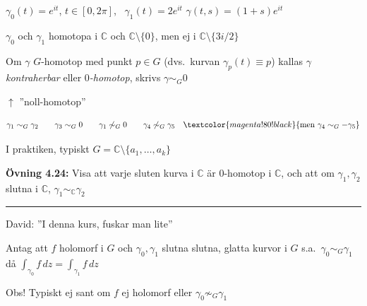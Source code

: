 \begin{example}
$\gamma_0(t) = e^{it}$, $t \in [0, 2\pi]$, \ $\gamma_1(t) = 2e^{it}$
$\gamma(t, s) = (1 + s)e^{it}$

$\gamma_0$ och $\gamma_1$ homotopa i $\mathbb{C}$ och $\mathbb{C} \setminus \{0\}$, men ej i $\mathbb{C} \setminus \{3i/2\}$
\end{example}

\begin{definition}
Om $\gamma$ $G$-homotop med punkt $p \in G$ (dvs.\ kurvan $\gamma_p(t) \equiv p$) kallas $\gamma$ \emph{kontraherbar} eller \emph{$0$-homotop}, skrivs $\gamma \sim_G 0$

\textcolor{blue!60!black}{$\uparrow$ ''noll-homotop''}
\end{definition}

\[ \gamma_1 \sim_G \gamma_2 \qquad \gamma_3 \sim_G 0 \qquad \gamma_1 \not\sim_G 0 \qquad \gamma_4 \not\sim_G \gamma_5 \quad \textcolor{magenta!80!black}{\text{men } \gamma_4 \sim_G -\gamma_5} \]

I praktiken, typiskt $G = \mathbb{C} \setminus \{a_1, \dots, a_k\}$

\textbf{Övning 4.24:} Visa att varje sluten kurva i $\mathbb{C}$ är $0$-homotop i $\mathbb{C}$, och att om $\gamma_1, \gamma_2$ slutna i $\mathbb{C}$, $\gamma_1 \sim_{\mathbb{C}} \gamma_2$

\noindent\rule{\linewidth}{0.4pt}

\hfill \textcolor{blue!60!black}{David: ''I denna kurs, fuskar man lite''}

\begin{theorem}
Antag att $f$ holomorf i $G$ och $\gamma_0, \gamma_1$ slutna slutna, glatta kurvor i $G$ s.a.\ $\gamma_0 \sim_G \gamma_1$ då $\displaystyle\int_{\gamma_0} f\,dz = \int_{\gamma_1} f\,dz$
\end{theorem}

\textcolor{red!70!black}{Obs!} Typiskt ej sant om $f$ ej holomorf eller $\gamma_0 \not\sim_G \gamma_1$

